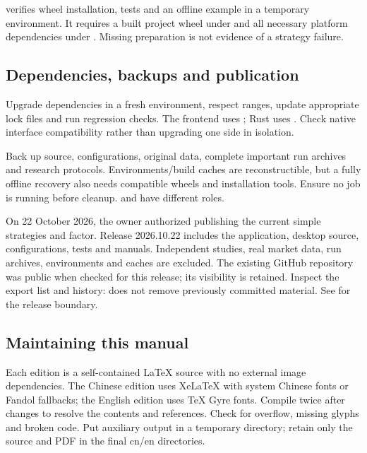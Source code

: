 \documentclass[11pt]{article}
\let\originalsubsection\subsection
\renewcommand{\subsection}{\Needspace{8\baselineskip}\originalsubsection}
\begin{document}
 verifies wheel installation, tests and an offline example in a temporary environment. It requires a built project wheel under  and all necessary platform dependencies under . Missing preparation is not evidence of a strategy failure.

\subsection{Dependencies, backups and publication}
Upgrade dependencies in a fresh environment, respect  ranges, update appropriate lock files and run regression checks. The frontend uses ; Rust uses . Check native interface compatibility rather than upgrading one side in isolation.

Back up source, configurations, original data, complete important run archives and research protocols. Environments/build caches are reconstructible, but a fully offline recovery also needs compatible wheels and installation tools. Ensure no job is running before cleanup.  and  have different roles.

On 22 October 2026, the owner authorized publishing the current simple strategies and factor. Release 2026.10.22 includes the application, desktop source, configurations, tests and manuals. Independent  studies, real market data, run archives, environments and caches are excluded. The existing GitHub repository was public when checked for this release; its visibility is retained. Inspect the export list and history:  does not remove previously committed material. See  for the release boundary.

\subsection{Maintaining this manual}
Each edition is a self-contained LaTeX source with no external image dependencies. The Chinese edition uses XeLaTeX with system Chinese fonts or Fandol fallbacks; the English edition uses TeX Gyre fonts. Compile twice after changes to resolve the contents and references. Check for overflow, missing glyphs and broken code. Put auxiliary output in a temporary directory; retain only the source and PDF in the final cn/en directories.
\end{document}
